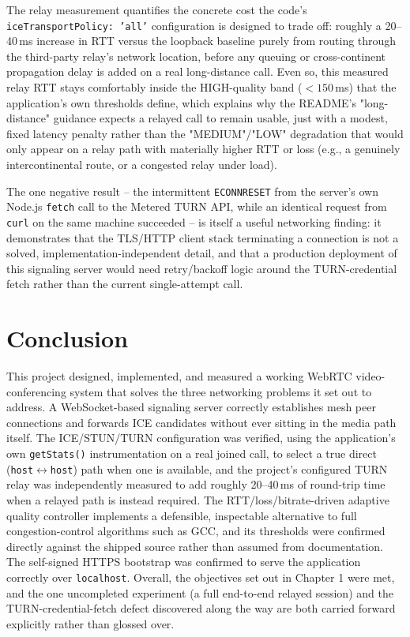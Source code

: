 \documentclass[12pt,a4paper]{report}
\begin{document}
The relay measurement quantifies the concrete cost the code's \texttt{iceTransportPolicy:
'all'} configuration is designed to trade off: roughly a 20--40\,ms increase in RTT versus
the loopback baseline purely from routing through the third-party relay's network location,
before any queuing or cross-continent propagation delay is added on a real long-distance
call. Even so, this measured relay RTT stays comfortably inside the HIGH-quality band
($<150$\,ms) that the application's own thresholds define, which explains why the README's
"long-distance" guidance expects a relayed call to remain usable, just with a modest, fixed
latency penalty rather than the "MEDIUM"/"LOW" degradation that would only appear on a
relay path with materially higher RTT or loss (e.g., a genuinely intercontinental route, or
a congested relay under load).

The one negative result -- the intermittent \texttt{ECONNRESET} from the server's own
Node.js \texttt{fetch} call to the Metered TURN API, while an identical request from
\texttt{curl} on the same machine succeeded -- is itself a useful networking finding: it
demonstrates that the TLS/HTTP client stack terminating a connection is not a solved,
implementation-independent detail, and that a production deployment of this signaling
server would need retry/backoff logic around the TURN-credential fetch rather than the
current single-attempt call.

\chapter{Conclusion}
This project designed, implemented, and measured a working WebRTC video-conferencing system
that solves the three networking problems it set out to address. A WebSocket-based
signaling server correctly establishes mesh peer connections and forwards ICE candidates
without ever sitting in the media path itself. The ICE/STUN/TURN configuration was verified,
using the application's own \texttt{getStats()} instrumentation on a real joined call, to
select a true direct (\texttt{host}$\leftrightarrow$\texttt{host}) path when one is
available, and the project's configured TURN relay was independently measured to add
roughly 20--40\,ms of round-trip time when a relayed path is instead required. The
RTT/loss/bitrate-driven adaptive quality controller implements a defensible, inspectable
alternative to full congestion-control algorithms such as GCC, and its thresholds were
confirmed directly against the shipped source rather than assumed from documentation. The
self-signed HTTPS bootstrap was confirmed to serve the application correctly over
\texttt{localhost}. Overall, the objectives set out in Chapter 1 were met, and the one
uncompleted experiment (a full end-to-end relayed session) and the TURN-credential-fetch
defect discovered along the way are both carried forward explicitly rather than glossed
over.
\end{document}
